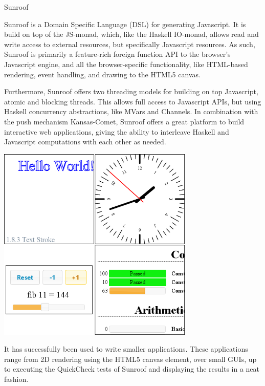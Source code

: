 \begin{hcarentry}[updated]{Sunroof}
\label{sunroof}
\makeheader

Sunroof is a Domain Specific Language (DSL) for generating Javascript.
It is build on top of the JS-monad, which, like the Haskell IO-monad, allows 
read and write access to external resources, but specifically Javascript
resources. As such, Sunroof is primarily a feature-rich foreign
function API to the browser's Javascript engine, and all the browser-specific
functionality, like HTML-based rendering, event handling, and 
drawing to the HTML5 canvas. 

Furthermore, Sunroof offers two threading models for 
building on top Javascript, atomic and blocking threads.
This allows full access to Javascript APIs, but
using Haskell concurrency abstractions, like MVars and Channels.
In combination with the push mechanism Kansas-Comet,
Sunroof offers a great platform to build interactive web applications,
giving the ability to interleave Haskell and Javascript computations
with each other as needed.

\begin{center}
\includegraphics[width=0.7\textwidth]{html/Sunroof-Examples.png}
\end{center}

It has successfully been used to write smaller applications. These
applications range from 2D rendering using the HTML5 canvas element,
over small GUIs, up to executing the QuickCheck tests of Sunroof 
and displaying the results in a neat fashion.


\end{hcarentry}
